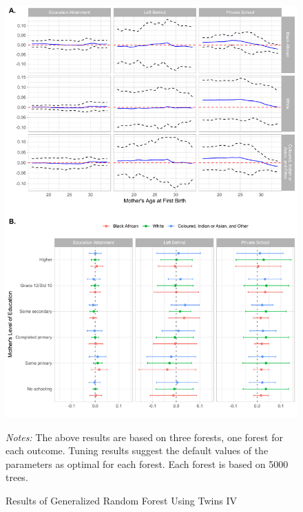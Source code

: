\documentclass[11pt,a4paper]{article}
\newcommand\fnote[1]{\captionsetup{font=footnotesize}\caption*{#1}}
\begin{document}
\begin{figure}[h!]
\centering
\caption{\label{fig:06}Results of Generalized Random Forest Using Twins IV}
\includegraphics[width=\textwidth]{figures/heter1.pdf}
\fnote{\textit{Notes:} The above results are based on three forests, one forest for each outcome. Tuning results suggest the default values of the parameters as optimal for each forest. Each forest is based on 5000 trees. }
\end{figure}
\end{document}
